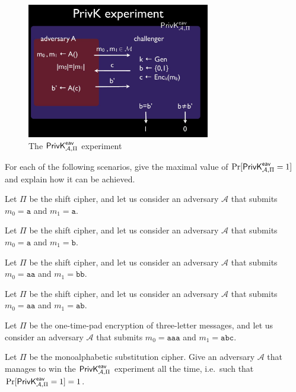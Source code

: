 \documentclass[a4paper,10pt,landscape,twocolumn]{scrartcl}
\begin{document}
\problems

%




\begin{figure}[h]
\center
\includegraphics[width=8cm]{PrivKexperiment.jpg}
\caption{The $\mathsf{PrivK}^{\mathsf{eav}}_{\mathcal{A},\Pi}$ experiment \label{fig:privk-eav}}
\end{figure}

\begin{exercise}
For each of the following scenarios, give the maximal value of $\Pr[\mathsf{PrivK}^{\mathsf{eav}}_{\mathcal{A},\Pi}=1]$ and explain how it can be achieved.

\begin{subex}
Let $\Pi$ be the shift cipher, and let us consider an adversary $\mathcal{A}$ that submits $m_0 = \mathtt{a}$ and $m_1 = \mathtt{a}$.
\end{subex}

\begin{subex}
Let $\Pi$ be the shift cipher, and let us consider an adversary $\mathcal{A}$ that submits $m_0 = \mathtt{a}$ and $m_1 = \mathtt{b}$.
\end{subex}

\begin{subex}
Let $\Pi$ be the shift cipher, and let us consider an adversary $\mathcal{A}$ that submits $m_0 = \mathtt{aa}$ and $m_1 = \mathtt{bb}$.
\end{subex}

\begin{subex}
Let $\Pi$ be the shift cipher, and let us consider an adversary $\mathcal{A}$ that submits $m_0 = \mathtt{aa}$ and $m_1 = \mathtt{ab}$.
\end{subex}

\begin{subex}
Let $\Pi$ be the one-time-pad encryption of three-letter messages, and let us consider an adversary $\mathcal{A}$ that submits $m_0 = \mathtt{aaa}$ and $m_1 = \mathtt{abc}$.
\end{subex}

\begin{subex}
Let $\Pi$ be the monoalphabetic substitution cipher. Give an adversary $\mathcal{A}$ that manages to win the $\mathsf{PrivK}^{\mathsf{eav}}_{\mathcal{A},\Pi}$ experiment all the time, i.e.\ such that $\Pr[\mathsf{PrivK}^{\mathsf{eav}}_{\mathcal{A},\Pi}=1] = 1$.
\end{subex}
\end{exercise}
\end{document}
